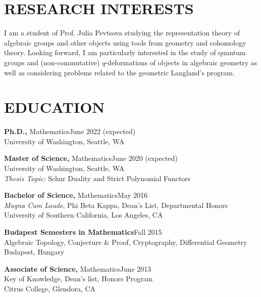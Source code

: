 \documentclass[margin]{res} %
\begin{document}
\begin{resume}

 
\section{RESEARCH INTERESTS}  

I am a student of Prof. Julia Pevtsova studying the representation theory of algebraic groups and 
other objects using tools from geometry and cohomology theory. Looking forward, I am particularly
interested in the study of quantum groups and (non-commutative) $q$-deformations of objects in algebraic 
geometry as well as considering problems related to the geometric Langland's program.


\section{EDUCATION}

{\bf Ph.D.,} Mathematics\hfill June 2022 (expected) \\
University of Washington, Seattle, WA

{\bf Master of Science,} Mathematics\hfill June 2020 (expected) \\
University of Washington, Seattle, WA \\
{\it Thesis Topic:} Schur Duality and Strict Polynomial Functors

{\bf Bachelor of Science,} Mathematics\hfill May 2016 \\
{\sl Magna Cum Laude}, Phi Beta Kappa, Dean's List, Departmental Honors \\
University of Southern California, Los Angeles, CA 

{\bf Budapest Semesters in Mathematics}\hfill Fall 2015 \\
Algebraic Topology, Conjecture \& Proof, Cryptography, Differential Geometry  \\
Budapest, Hungary 

{\bf Associate of Science,} Mathematics\hfill June 2013\\
Key of Knowledge, Dean's list, Honors Program \\
Citrus College, Glendora, CA 
 

\end{resume}
\end{document}

